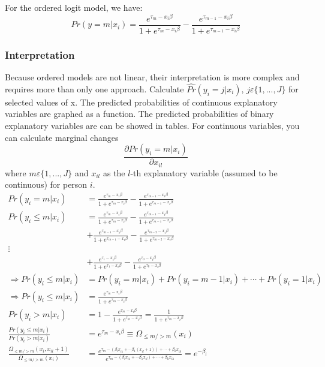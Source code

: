			For the ordered logit model, we have:
			\begin{equation*}
				Pr(y=m|x_i)=\frac{e^{\tau_m - x_i \beta}}{1+e^{\tau_m - x_i \beta}}-\frac{e^{\tau_{m-1} - x_i \beta}}{1+e^{\tau_{m-1} - x_i \beta}}
			\end{equation*}
		\subsubsection{Interpretation}
			Because ordered models are not linear, their interpretation is more complex and requires more than only one approach.
				Calculate $\widehat{Pr}(y_i=j|x_i),\,j\varepsilon\{1,...,J\}$ for selected values of x.
				The predicted probabilities of continuous explanatory variables are graphed as a function.
				The predicted probabilities of binary explanatory variables are can be showed in tables.
				For continuous variables, you can calculate marginal changes
				\begin{equation*}
					\frac{\partial Pr(y_i=m|x_i)}{\partial x_{il}}
				\end{equation*}	
				where $m\varepsilon\{1,...,J\}$ and $x_{il}$ as the $l$-th explanatory variable (assumed to be continuous) for person $i$.
				\begin{align*}
					Pr(y_i=m|x_i)&=\frac{e^{\tau_m-x_i\beta}}{1+e^{\tau_m-x_i\beta}}-\frac{e^{\tau_{m-1}-x_i\beta}}{1+e^{\tau_{m-1}-x_i\beta}}\\
					Pr(y_i\leq m|x_i)&=\frac{e^{\tau_m-x_i\beta}}{1+e^{\tau_m-x_i\beta}}-\frac{e^{\tau_{m-1}-x_i\beta}}{1+e^{\tau_{m-1}-x_i\beta}}\\
					&+\frac{e^{\tau_{m-1}-x_i\beta}}{1+e^{\tau_{m-1}-x_i\beta}}-\frac{e^{\tau_{m-2}-x_i\beta}}{1+e^{\tau_{m-2}-x_i\beta}}\\
					\vdots\\
					&+\frac{e^{\tau_{1}-x_i\beta}}{1+e^{\tau_{1}-x_i\beta}}-\frac{e^{\tau_{0}-x_i\beta}}{1+e^{\tau_{0}-x_i\beta}}\\
					\Longrightarrow Pr(y_i\leq m|x_i)&=	Pr(y_i= m|x_i)+Pr(y_i= m-1|x_i)+\cdots+Pr(y_i=1|x_i)\\
					\Longrightarrow Pr(y_i\leq m|x_i)&=\frac{e^{\tau_m-x_i\beta}}{1+e^{\tau_m-x_i\beta}}\\
					Pr(y_i> m|x_i)&=1-\frac{e^{\tau_m-x_i\beta}}{1+e^{\tau_m-x_i\beta}}=\frac{1}{1+e^{\tau_m-x_i\beta}}\\
					\frac{Pr(y_i\leq m|x_i)}{Pr(y_i> m|x_i)}&=e^{\tau_m-x_i\beta}\equiv \Omega_{\leq m / > m}(x_i)\\
					\frac{\Omega_{\leq m / > m}(x_i,x_{il}+1)}{\Omega_{\leq m / > m}(x_i)}&=\frac{e^{\tau_m-\left(\beta_l x_{i1}+\cdots\beta_1 (x_{il}+1) \right)+\cdots+\beta_k x_{ik}}}{e^{\tau_m-\left(\beta_l x_{i1}+\cdots\beta_1 x_{il} \right)+\cdots+\beta_k x_{ik}}}=e^{-\beta_l}
				\end{align*}	
